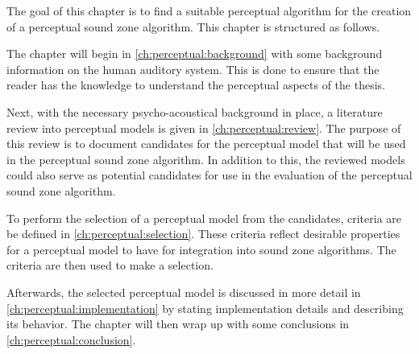 The goal of this chapter is to find a suitable perceptual algorithm for the creation of a perceptual sound zone algorithm.
This chapter is structured as follows.

The chapter will begin in \autoref{ch:perceptual:background} with some background information on the human auditory system.
This is done to ensure that the reader has the knowledge to understand the perceptual aspects of the thesis.

Next, with the necessary psycho-acoustical background in place, a literature review into perceptual models is given in \autoref{ch:perceptual:review}.
The purpose of this review is to document candidates for the perceptual model that will be used in the perceptual sound zone algorithm.
In addition to this, the reviewed models could also serve as potential candidates for use in the evaluation 
of the perceptual sound zone algorithm.

To perform the selection of a perceptual model from the candidates, criteria are be defined in \autoref{ch:perceptual:selection}. 
These criteria reflect desirable properties for a perceptual model to have for integration into sound zone algorithms.
The criteria are then used to make a selection.

Afterwards, the selected perceptual model is discussed in more detail in
\autoref{ch:perceptual:implementation} by stating implementation details and describing its behavior.
The chapter will then wrap up with some conclusions in \autoref{ch:perceptual:conclusion}.
